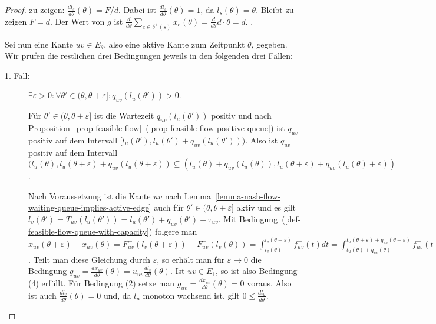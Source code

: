 \begin{proof}
	zu zeigen: $\frac{dl_s}{d\theta}(\theta) = F/d$.
	Dabei ist $\frac{dl_s}{d\theta}(\theta) = 1$, da $l_s(\theta) = \theta$. Bleibt zu zeigen $F= d$.
	Der Wert von $g$ ist $\frac{d}{d\theta}\sum_{e\in\delta^+(s)}x_e(\theta) = \frac{d}{d\theta} d\cdot\theta = d$. .
	
	Sei nun eine Kante $uv\in E_\theta$, also eine aktive Kante zum Zeitpunkt $\theta$, gegeben. Wir prüfen die restlichen drei Bedingungen jeweils in den folgenden drei Fällen:
	
	\begin{description}
		\item[1. Fall:] $\exists \varepsilon > 0:\forall \theta'\in (\theta, \theta + \varepsilon ] : q_{uv}(l_u(\theta')) > 0$.
		
		Für $\theta'\in(\theta,\theta+\varepsilon]$ ist die Wartezeit $q_{uv}(l_u(\theta'))$ positiv und nach Proposition~\ref{prop-feasible-flow}~(\ref{prop-feasible-flow-positive-queue}) ist $q_{uv}$ positiv auf dem Intervall $[ l_u(\theta')  , l_u(\theta')+q_{uv}(l_u(\theta')) )$.
		Also ist $q_{uv}$ positiv auf dem Intervall $( l_u(\theta) , l_u(\theta + \varepsilon) + q_{uv}(l_u(\theta + \varepsilon) )
		\subseteq ( l_u(\theta) + q_{uv}(l_u(\theta)) , l_u(\theta + \varepsilon) + q_{uv}(l_u(\theta) + \varepsilon ) )$.
		
		Nach Voraussetzung ist die Kante ${uv}$ nach Lemma~\ref{lemma-nash-flow-waiting-queue-implies-active-edge} auch für $\theta'\in  (\theta, \theta + \varepsilon ]$ aktiv und es gilt $l_v(\theta') = T_{uv}(l_u(\theta')) = l_u(\theta') + q_{uv}(\theta') + \tau_{uv}$.
		Mit Bedingung~(\ref{def-feasible-flow-queue-with-capacity}) folgere man $x_{uv}(\theta + \varepsilon) - x_{uv}(\theta) = F_{uv}^-(l_v(\theta + \varepsilon)) - F_{uv}^-(l_v(\theta))
		= \int_{l_v(\theta)}^{l_v(\theta + \varepsilon)} f_{uv}^-(t) dt
		= \int_{l_u(\theta) + q_{uv}(\theta)}^{l_u(\theta + \varepsilon) + q_{uv}(\theta + \varepsilon)} f_{uv}^-(t + \tau_{uv}) dt
		= u_{uv} (l_v(\theta + \varepsilon) - l_v(\theta))$.
		Teilt man diese Gleichung durch $\varepsilon$, so erhält man für $\varepsilon\rightarrow 0$ die Bedingung $g_{uv} = \frac{dx_{uv}}{d\theta}(\theta) = u_{uv} \frac{dl_v}{d\theta}(\theta)$.
		Ist $uv\in E_1$, so ist also Bedingung (4) erfüllt.
		Für Bedingung (2) setze man $g_{uv}=\frac{dx_{uv}}{d\theta}(\theta)=0$ voraus.
		Also ist auch $\frac{dl_v}{d\theta}(\theta)=0$ und, da $l_u$ monoton wachsend ist, gilt $0 \leq \frac{dl_u}{d\theta}$.


\end{description}
\end{proof}
